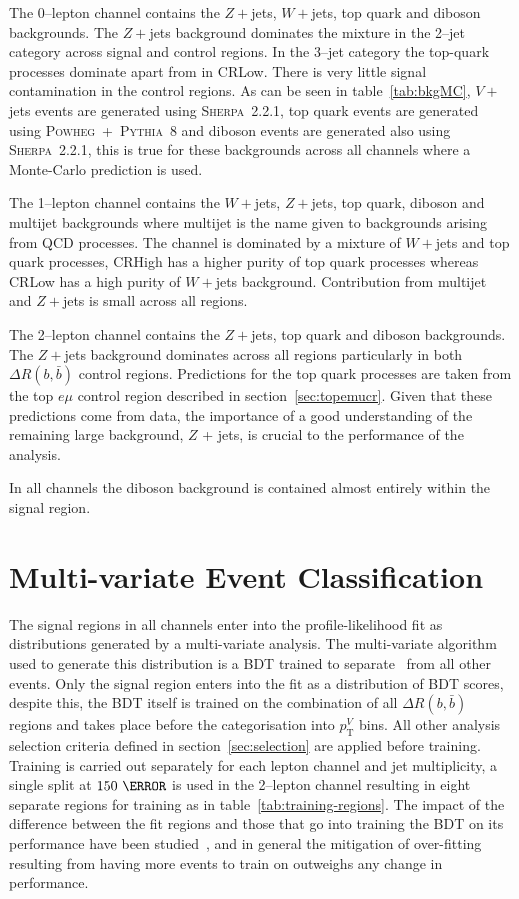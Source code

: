 The 0--lepton channel contains the  $Z + $jets, $W+$jets, top quark and
diboson backgrounds. The $Z+$jets background dominates the mixture in the
2--jet category across signal and control regions. In the 3--jet category the
top-quark processes dominate apart from in CRLow. There is very little signal
contamination in the control regions. As can be seen in table~\ref{tab:bkgMC},
$V+$jets events are generated using \textsc{Sherpa~2.2.1}, top quark events
are generated using \textsc{Powheg}~+~\textsc{Pythia~8} and diboson events are
generated also using \textsc{Sherpa~2.2.1}, this is true for these backgrounds
across all channels where a Monte-Carlo prediction is used.


The 1--lepton channel contains the $W+$jets, $Z+$jets, top quark, diboson
and multijet backgrounds where multijet is the name given to backgrounds arising
from QCD processes. The channel is dominated by a mixture of $W+$jets and top
quark processes, CRHigh has a higher purity of top quark processes whereas CRLow
has a high purity of $W+$jets background. Contribution from multijet and
$Z+$jets is small across all regions.

The 2--lepton channel contains the $Z+$jets, top quark and diboson
backgrounds. The $Z+$jets background dominates across all regions particularly
in both $\Delta R(b, \bar{b})$ control regions. Predictions for the top quark
processes are taken from the top $e \mu$ control region described in
section~\ref{sec:topemucr}. Given that these predictions come from data, the
importance of a good understanding of the remaining large background, $Z$ +
jets, is crucial to the performance of the analysis.

In all channels the diboson background is contained almost entirely within the
signal region.

\section{Multi-variate Event Classification}%
\label{sec:mva}

The signal regions in all channels enter into the profile-likelihood fit as
distributions generated by a multi-variate analysis. The multi-variate algorithm
used to generate this distribution is a BDT trained to separate \VHbb\ from all
other events. Only the signal region enters into the fit as a distribution of
BDT scores, despite this, the BDT itself is trained on the combination of all
$\Delta R(b, \bar{b})$ regions and takes place before the categorisation into
$p_{\mathrm{T}}^V$ bins. All other analysis selection criteria defined in
section~\ref{sec:selection} are applied before training. Training is carried out
separately for each lepton channel and jet multiplicity, a single split at
$150~\GeV$ is used in the 2--lepton channel resulting in eight separate regions
for training as in table~\ref{tab:training-regions}. The impact of the
difference between the fit regions and those that go into training the BDT on
its performance have been studied~\cite{VHMainNote2019}, and in general the
mitigation of over-fitting resulting from having more events to train on
outweighs any change in performance.

